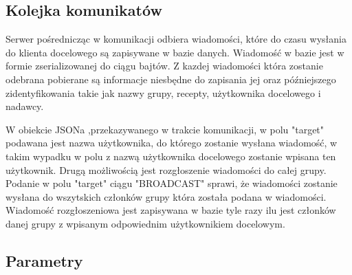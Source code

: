 \documentclass[11pt,a4paper,polish,thesis]{dcsbook}
\begin{document}
\subsection{Kolejka komunikatów}
Serwer pośrednicząc w komunikacji odbiera wiadomości, które do czasu wysłania do klienta docelowego są zapisywane w bazie danych.
Wiadomość w bazie jest w formie zserializowanej do ciągu bajtów.
Z kazdej wiadomości która zostanie odebrana pobierane są informacje niesbędne do zapisania jej oraz późniejszego zidentyfikowania takie jak nazwy grupy, recepty, użytkownika docelowego i nadawcy.

W obiekcie JSONa ,przekazywanego w trakcie komunikacji, w polu "target" podawana jest nazwa użytkownika, do którego zostanie wysłana wiadomość, w takim wypadku w polu z nazwą użytkownika docelowego zostanie wpisana ten użytkownik.
Drugą możliwością jest rozgłoszenie wiadomości do całej grupy. Podanie w polu "target" ciągu "BROADCAST" sprawi, że wiadomości zostanie wysłana do wszytskich członków grupy która została podana w wiadomości. 
Wiadomość rozgłoszeniowa jest zapisywana w bazie tyle razy ilu jest członków danej grupy z wpisanym odpowiednim użytkownikiem docelowym. 
 

\subsection{Parametry}
\end{document}
